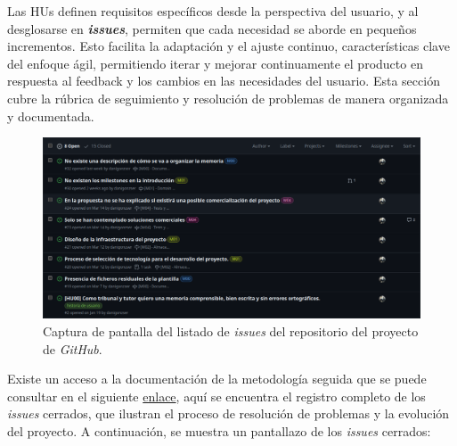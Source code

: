 Las HUs definen requisitos específicos desde la perspectiva del usuario, y al desglosarse en \textit{\textbf{issues}}, permiten que cada necesidad se aborde en pequeños incrementos. Esto facilita la adaptación y el ajuste continuo, características clave del enfoque ágil, permitiendo iterar y mejorar continuamente el producto en respuesta al feedback y los cambios en las necesidades del usuario. Esta sección cubre la rúbrica de seguimiento y resolución de problemas de manera organizada y documentada.

\begin{figure}[H]
    \caption{Captura de pantalla del listado de \textit{issues} del repositorio del proyecto de \textit{GitHub}.}
    \centering
    \vspace*{0.5cm}
    \includegraphics[scale=0.2]{figuras/github_issues.png}
\end{figure}

Existe un acceso a la documentación de la metodología seguida que se puede consultar en el siguiente \href{https://github.com/danigonzser/proyecto-tfg/issues?q=is%3Aissue+is%3Aclosed}{enlace}, aquí se encuentra el registro completo de los \textit{issues} cerrados, que ilustran el proceso de resolución de problemas y la evolución del proyecto. A continuación, se muestra un pantallazo de los \textit{issues} cerrados:


